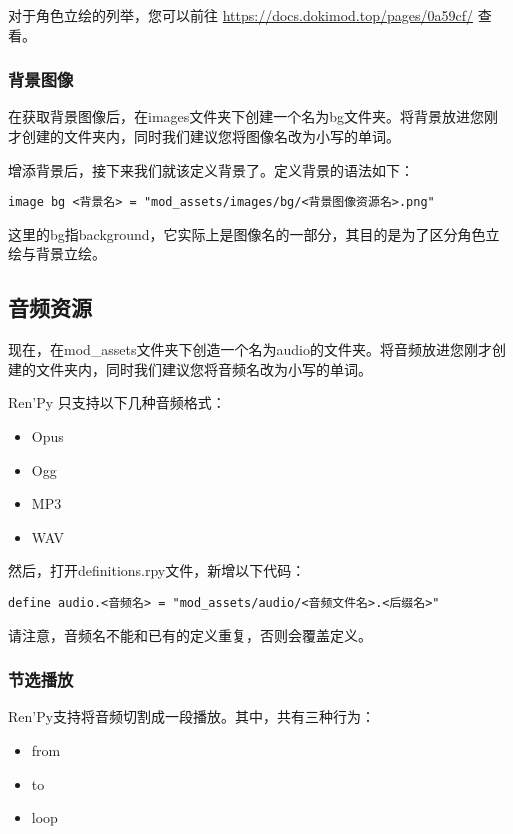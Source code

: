 对于角色立绘的列举，您可以前往 \url{https://docs.dokimod.top/pages/0a59cf/} 查看。

\subsubsection{背景图像}
在获取背景图像后，在images文件夹下创建一个名为bg文件夹。将背景放进您刚才创建的文件夹内，同时我们建议您将图像名改为小写的单词。

增添背景后，接下来我们就该定义背景了。定义背景的语法如下：

\begin{lstlisting}
image bg <背景名> = "mod_assets/images/bg/<背景图像资源名>.png"
\end{lstlisting}

\begin{ExtraKnowledge}
    这里的bg指background，它实际上是图像名的一部分，其目的是为了区分角色立绘与背景立绘。
\end{ExtraKnowledge}

\subsection{音频资源}
现在，在mod\_assets文件夹下创造一个名为audio的文件夹。将音频放进您刚才创建的文件夹内，同时我们建议您将音频名改为小写的单词。

\begin{Warning}
    Ren'Py 只支持以下几种音频格式：
    \begin{itemize}
        \item Opus
        \item Ogg
        \item MP3
        \item WAV
    \end{itemize}
\end{Warning}

然后，打开definitions.rpy文件，新增以下代码：
\begin{lstlisting}
define audio.<音频名> = "mod_assets/audio/<音频文件名>.<后缀名>"
\end{lstlisting}

请注意，音频名不能和已有的定义重复，否则会覆盖定义。

\subsubsection{节选播放}
Ren'Py支持将音频切割成一段播放。其中，共有三种行为：
\begin{itemize}
    \item from
    \item to
    \item loop
\end{itemize}

